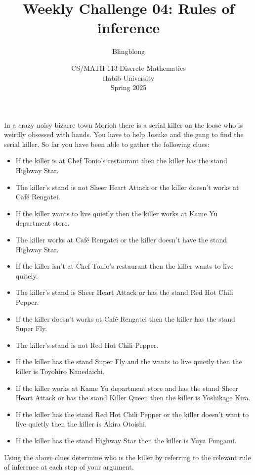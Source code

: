 \documentclass[a4paper]{exam}
\title{Weekly Challenge 04: Rules of inference}
\author{Blingblong} %
\date{CS/MATH 113 Discrete Mathematics\\Habib University\\Spring 2025}
\begin{document}
\maketitle


\begin{questions}
    In a crazy noisy bizarre town Morioh there is a serial killer on the loose who is weirdly obsessed with hands. You have to help Josuke and the gang to find the serial killer. So far you have been able to gather the following clues:
    \begin{itemize}
        \item If the killer is at Chef Tonio's restaurant then the killer has the stand Highway Star.
        \item The killer's stand is not Sheer Heart Attack or the killer doesn't works at Café Rengatei.
        \item If the killer wants to live quietly then the killer works at Kame Yu department store.
        \item The killer works at Café Rengatei or the killer doesn't have the stand Highway Star.
        \item If the killer isn't at Chef Tonio's restaurant then the killer wants to live quitely.
        \item The killer's stand is Sheer Heart Attack or has the stand Red Hot Chili Pepper.
        \item If the killer doesn't works at Café Rengatei then the killer has the stand Super Fly.
        \item The killer's stand is not Red Hot Chili Pepper.
        \item If the killer has the stand Super Fly and the wants to live quietly then the killer is Toyohiro Kanedaichi.
        \item If the killer works at Kame Yu department store and has the stand Sheer Heart Attack or has the stand Killer Queen then the killer is Yoshikage Kira.
        \item If the killer has the stand Red Hot Chili Pepper or the killer doesn't want to live quietly then the killer is Akira Otoishi. 
        \item If the killer has the stand Highway Star then the killer is Yuya Fungami.
    \end{itemize}
    Using the above clues determine who is the killer by referring to the relevant rule of inference at each step of your argument.
    \begin{solution}
    \end{solution}




\end{questions}
\end{document}
